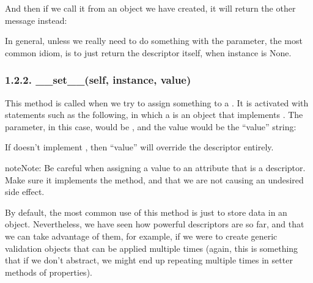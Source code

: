 \documentclass[a4paper,10pt,english]{sphinxmanual}
\begin{document}
\begin{sphinxVerbatim}[commandchars=\\\{\}]
\end{sphinxVerbatim}

And then if we call it from an object we have created, it will return the other message
instead:

\begin{sphinxVerbatim}[commandchars=\\\{\}]
\end{sphinxVerbatim}

In general, unless we really need to do something with the  parameter, the most
common idiom, is to just return the descriptor itself, when instance is None.


\subsubsection{1.2.2. \_\_set\_\_(self, instance, value)}
\label{\detokenize{chapters/6_descriptors/index:set-self-instance-value}}
This method is called when we try to assign something to a . It is activated
with statements such as the following, in which a  is an object that implements
. The  parameter, in this case, would be , and
the value would be the “value” string: 

If  doesn’t implement , then “value” will override the
descriptor entirely.

\begin{sphinxadmonition}{note}{Note:}
Be careful when assigning a value to an attribute that is a descriptor. Make sure it implements the  method, and that we are not causing an undesired side effect.
\end{sphinxadmonition}

By default, the most common use of this method is just to store data in an object.
Nevertheless, we have seen how powerful descriptors are so far, and that we can take
advantage of them, for example, if we were to create generic validation objects that can be
applied multiple times (again, this is something that if we don’t abstract, we might end up
repeating multiple times in setter methods of properties).
\end{document}
